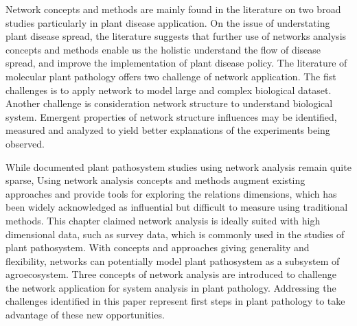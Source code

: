Network concepts and methods are mainly found in the literature on two broad studies particularly in plant disease application. On the issue of understating plant disease spread, the literature suggests that further use of networks analysis concepts and methods enable us the holistic understand the flow of disease spread, and improve the implementation of plant disease policy. The literature of molecular plant pathology offers two challenge of network application. The fist challenges is to apply network to model large and complex biological dataset. Another challenge is consideration network structure to understand biological system. Emergent properties of network structure influences  may be identified, measured and analyzed to yield better explanations of the experiments being observed.

While documented plant pathosystem studies using network analysis remain quite sparse, Using network analysis concepts and methods augment existing approaches and provide tools for exploring the relations dimensions, which has been widely acknowledged as influential but difficult to measure using traditional methods. This chapter claimed network analysis is ideally suited with high dimensional data, such as survey data, which is commonly used in the studies of plant pathosystem. With concepts and approaches giving generality and flexibility, networks can potentially model plant pathosystem as a subsystem of agroecosystem. Three concepts of network analysis are introduced to challenge the network application for system analysis in plant pathology. Addressing the challenges identified in this paper represent first steps in plant pathology  to take advantage of these new opportunities.

